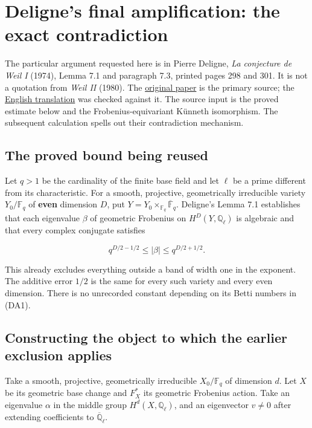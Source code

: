 \section{Deligne's final amplification: the exact
contradiction}\label{delignes-final-amplification-the-exact-contradiction}

The particular argument requested here is in Pierre Deligne, \emph{La
conjecture de Weil I} (1974), Lemma 7.1 and paragraph 7.3, printed pages
298 and 301. It is not a quotation from \emph{Weil II} (1980). The
\href{https://www.numdam.org/item/PMIHES_1974__43__273_0.pdf}{original
paper} is the primary source; the
\href{https://arxiv.org/abs/1807.10810}{English translation} was checked
against it. The source input is the proved estimate below and the
Frobenius-equivariant Künneth isomorphism. The subsequent calculation
spells out their contradiction mechanism.

\subsection{The proved bound being
reused}\label{the-proved-bound-being-reused}

Let \(q>1\) be the cardinality of the finite base field and let \(\ell\)
be a prime different from its characteristic. For a smooth, projective,
geometrically irreducible variety \(Y_0/\mathbb F_q\) of \textbf{even}
dimension \(D\), put
\(Y=Y_0\times_{\mathbb F_q}\overline{\mathbb F}_q\). Deligne's Lemma 7.1
establishes that each eigenvalue \(\beta\) of geometric Frobenius on
\(H^D(Y,\mathbb Q_\ell)\) is algebraic and that every complex conjugate
satisfies

\[q^{D/2-1/2}\le |\beta|\le q^{D/2+1/2}.\tag{DA1}\]

This already excludes everything outside a band of width one in the
exponent. The additive error \(1/2\) is the same for every such variety
and every even dimension. There is no unrecorded constant depending on
its Betti numbers in (DA1).

\subsection{Constructing the object to which the earlier exclusion
applies}\label{constructing-the-object-to-which-the-earlier-exclusion-applies}

Take a smooth, projective, geometrically irreducible \(X_0/\mathbb F_q\)
of dimension \(d\). Let \(X\) be its geometric base change and \(F_X^*\)
its geometric Frobenius action. Take an eigenvalue \(\alpha\) in the
middle group \(H^d(X,\mathbb Q_\ell)\), and an eigenvector \(v\ne0\)
after extending coefficients to \(\overline{\mathbb Q}_\ell\).

